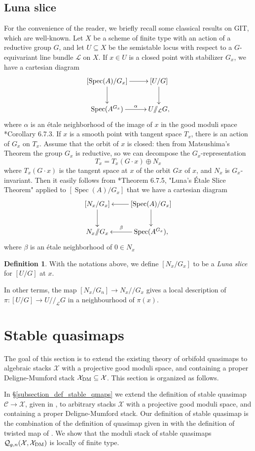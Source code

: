 \documentclass{amsart}
\newcommand{\sC}{\mathscr{C}}
\newcommand{\cL}{\mathcal{L}}
\newcommand{\cQ}{\mathcal{Q}}
\newcommand{\cX}{\mathcal{X}}
\newcommand{\spec}{\operatorname{Spec}}
\newcommand{\dm}{{\rm DM}}
\theoremstyle{definition}
\newtheorem{Def}[theorem]{Definition}
\theoremstyle{definition}
\begin{document}
{ \subsection{Luna slice}\label{subsection_luna_slice}
 For the convenience of the reader, we briefly recall some classical results on GIT, which are well-known.
    Let $X$ be a scheme of finite type with an action of a reductive group $G$, and let $U\subseteq X$ be the semistable locus with respect to a $G$-equivariant line bundle $\cL$ on $X$. If $x\in U$ is a closed point with stabilizer $G_x$, we have a cartesian diagram
    \[
    \xymatrix{
    [\spec(A)/G_x]\ar[r]\ar[d] & [U/G]\ar[d] \\ 
    \spec(A^{G_x})\ar[r]^-\alpha  & U/\!\!/_{\cL} G,
    }
    \]
    where $\alpha$ is an \'{e}tale neighborhood of the image of $x$ in the good moduli space \cite{Alp21}*{Corollary 6.7.3}. If $x$ is a smooth point with tangent space $T_x$, there is an action of $G_x$ on $T_x$. 
    Assume that the orbit of $x$ is closed: then from Matsushima’s Theorem the group $G_x$ is reductive, so we can decompose the $G_x$-representation \[T_x=T_x(G\cdot x)\oplus N_x\] where $T_x(G\cdot x)$ is the tangent space at $x$ of the orbit $Gx$ of $x$, and $N_x$ is $G_x$-invariant. Then it easily follows from  \cite{Alp21}*{Theorem 6.7.5, "Luna’s \'{E}tale Slice Theorem"} applied to $[\spec(A)/G_x]$ that we have a cartesian diagram
    \[
    \xymatrix{[N_x/G_x]\ar[d] & [\spec(A)/G_x]\ar[l]\ar[d] \\
    N_x/\!\!/G_x & \spec(A^{G_x}) \ar[l]_-\beta ,}
    \]
    where $\beta$ is an \'{e}tale neighborhood of $0\in N_x$
\begin{Def}
    With the notations above, we define $[N_x/G_x]$ to be a \textit{Luna slice} for $[U/G]$ at $x$.
\end{Def}
In other terms, the map $[N_x/G_n]\to N_x/\!\!/G_x$ gives a local description of $\pi:[U/G]\to U/\!\!/_\cL G$ in a neighbourhood of $\pi(x)$.

\section{Stable quasimaps}\label{sec:qmaps}
The goal of this section is to extend the existing theory of orbifold quasimaps to algebraic stacks $\cX$ with a projective good moduli space, and containing a proper Deligne-Mumford stack $\cX_\dm\subseteq \cX$. 
This section is organized as follows.

In \S \ref{subsection_def_stable_qmaps} we extend the definition of stable quasimap $\sC\to \cX$, given in \cite{ciocan2014stable}, to arbitrary stacks $\cX$ with a projective good moduli space, and containing a proper Deligne-Mumford stack. Our definition of stable quasimap is the combination of the definition of quasimap given in \cite{ciocan2014stable} with the definition of twisted map of \cite{dli1}.
We show that the moduli stack of stable quasimaps $\cQ_{g,n}(\cX,\cX_\dm)$ is locally of finite type. 

}
\end{document}

